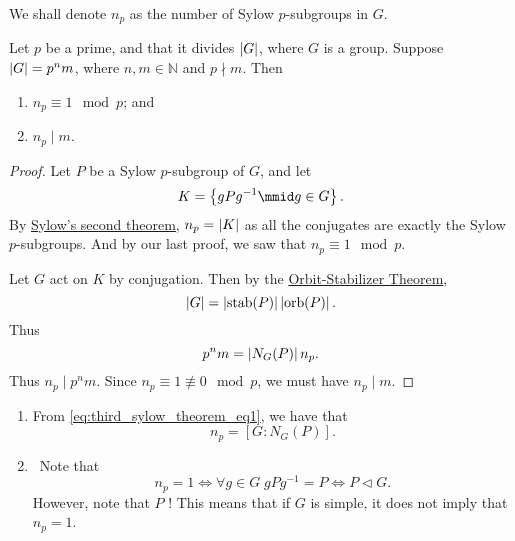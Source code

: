 \documentclass[notoc,notitlepage]{tufte-book}
\DeclareMathOperator{\stab}{stab}
\DeclareMathOperator{\orb}{orb}
\begin{document}
\begin{note}[Notation]
  We shall denote $n_p$ as the number of Sylow $p$-subgroups in $G$.
\end{note}

\begin{thm}\label{thm:third_sylow_theorem}
  Let $p$ be a prime, and that it divides $\left|G\right|$, where $G$ is a group.
  Suppose $\left|G\right| = p^n m$, where $n, m \in \mathbb{N}$ and $p \nmid m$.
  Then
  \begin{enumerate}
    \item $n_p \equiv 1 \mod p$; and
    \item $n_p \mid m$.
  \end{enumerate}
\end{thm}

\begin{proof}
  Let $P$ be a Sylow $p$-subgroup of $G$, and let
  \begin{equation*}
    K = \left\{ gPg^{-1} \mmid g \in G \right\}.
  \end{equation*}
  By \hyperref[thm:second_sylow_theorem]{Sylow's second theorem},
  $n_p = \left|K\right|$ as all the conjugates are exactly the Sylow
  $p$-subgroups. And by our last proof, we saw that $n_p \equiv 1 \mod p$.

  Let $G$ act on $K$ by conjugation. Then by the \hyperref[thm:orbit_stabilizer_theorem]{Orbit-Stabilizer Theorem},
  \begin{equation*}
    \abs{G} = \abs{\stab(P)}\abs{\orb(P)}.
  \end{equation*}
  Thus
  \begin{equation}\label{eq:third_sylow_theorem_eq1}
    p^n m = \left| N_G(P) \right| n_p.
  \end{equation}
  Thus $n_p \mid p^n m$. Since $n_p \equiv 1 \not\equiv 0 \mod p$,
  we must have $n_p \mid m$.
\end{proof}

\begin{remark}
  \begin{enumerate}
    \item From \cref{eq:third_sylow_theorem_eq1}, we have that
      \begin{equation*}
        n_p = [ G : N_G(P) ].
      \end{equation*}
    \item \imponote\ Note that
      \begin{equation*}
        n_p = 1 \iff \forall g \in G \; gPg^{-1} = P \iff P \triangleleft G.
      \end{equation*}
      However, note that $P$ ! This means that if $G$
      is simple, it does not imply that $n_p = 1$.
  \end{enumerate}
\end{remark}
\end{document}
